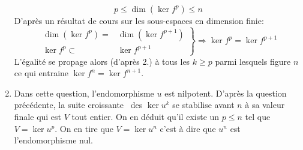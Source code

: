 \begin{enumerate}
\begin{displaymath}
 p\leq \dim (\ker f^p) \leq n
\end{displaymath}
D'après un résultat de cours sur les sous-espaces en dimension finie:
\begin{displaymath}
 \left. 
\begin{aligned}
 \dim (\ker f^p) =& \dim (\ker f^{p+1}) \\
 \ker f^p \subset& \ker f^{p+1}
\end{aligned}
\right\rbrace 
\Rightarrow \ker f^p = \ker f^{p+1}
\end{displaymath}
L'égalité se propage alors (d'après 2.) à tous les $k\geq p$ parmi lesquels figure $n$ ce qui entraine $\ker f^n = \ker f^{n+1}$.
\item Dans cette question, l'endomorphisme $u$ est nilpotent. D'après la question précédente, la suite \og croissante\fg~ des $\ker u^k$ se stabilise avant $n$ à sa valeur finale qui est $V$ tout entier. On en déduit qu'il existe un $p\leq n$ tel que $V=\ker u^p$.\newline
On en tire que $V=\ker u^n$ c'est à dire que $u^n$ est l'endomorphisme nul.
\end{enumerate}

